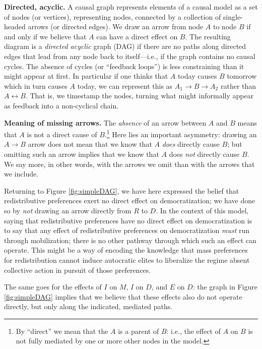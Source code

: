 \documentclass[
  12pt,
]{book}
\begin{document}
\textbf{Directed, acyclic.} A causal graph represents elements of a causal model as a set of nodes (or vertices), representing nodes, connected by a collection of single-headed arrows (or directed edges). We draw an arrow from node \(A\) to node \(B\) if and only if we believe that \(A\) can have a direct effect on \(B\). The resulting diagram is a \emph{directed acyclic} graph (DAG) if there are no paths along directed edges that lead from any node back to itself---i.e., if the graph contains no causal cycles. The absence of cycles (or ``feedback loops'') is less constraining than it might appear at first. In particular if one thinks that \(A\) today causes \(B\) tomorrow which in turn causes \(A\) today, we can represent this as \(A_1 \rightarrow B \rightarrow A_2\) rather than \(A \leftrightarrow B\). That is, we timestamp the nodes, turning what might informally appear as feedback into a non-cyclical chain.

\textbf{Meaning of missing arrows.} The \emph{absence} of an arrow between \(A\) and \(B\) means that \(A\) is not a direct cause of \(B\).\footnote{By ``direct'' we mean that the \(A\) is a parent of \(B\): i.e., the effect of \(A\) on \(B\) is not fully mediated by one or more other nodes in the model.} Here lies an important asymmetry: drawing an \(A \rightarrow B\) arrow does not mean that we know that \(A\) \emph{does} directly cause \(B\); but omitting such an arrow implies that we know that \(A\) does \emph{not} directly cause \(B\). We say more, in other words, with the arrows we omit than with the arrows that we include.

Returning to Figure \ref{fig:simpleDAG}, we have here expressed the belief that redistributive preferences exert no direct effect on democratization; we have done so by \emph{not} drawing an arrow directly from \(R\) to \(D\). In the context of this model, saying that redistributive preferences have no direct effect on democratization is to say that any effect of redistributive preferences on democratization \emph{must} run through mobilization; there is no other pathway through which such an effect can operate. This might be a way of encoding the knowledge that mass preferences for redistribution cannot induce autocratic elites to liberalize the regime absent collective action in pursuit of those preferences.

The same goes for the effects of \(I\) on \(M\), \(I\) on \(D\), and \(E\) on \(D\): the graph in Figure \ref{fig:simpleDAG} implies that we believe that these effects also do not operate directly, but only along the indicated, mediated paths.
\end{document}
